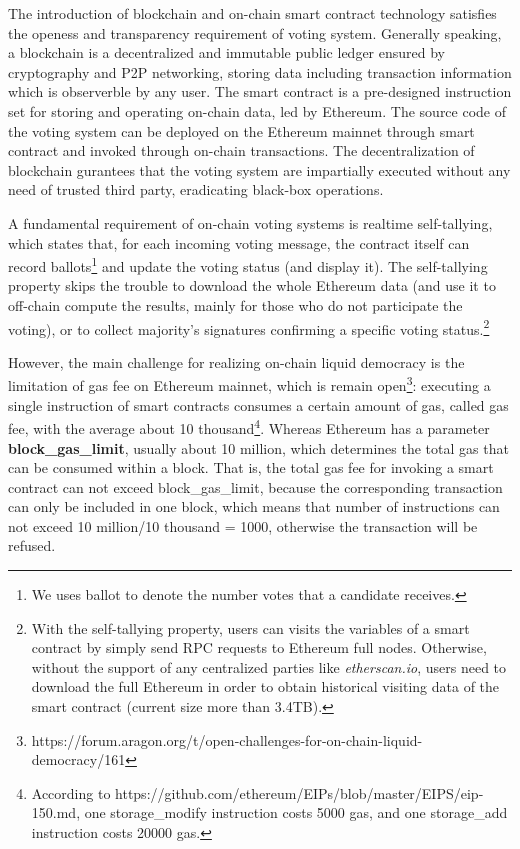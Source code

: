 The introduction of blockchain \cite{nakamoto2008bitcoin} and on-chain smart contract technology \cite{wood2014ethereum} satisfies the openess and transparency requirement of voting system. Generally speaking, a blockchain is a decentralized and immutable public ledger ensured by cryptography and P2P networking, storing data including transaction information which is observerble by any user. The smart contract is a pre-designed instruction set for storing and operating on-chain data, led by Ethereum. The source code of the voting system can be deployed on the Ethereum mainnet through smart contract and invoked through on-chain transactions. %
The decentralization of blockchain gurantees that the voting system are impartially executed without any need of trusted third party, eradicating black-box operations.

 A fundamental requirement of on-chain voting systems is realtime self-tallying, which states that, for each incoming voting message,  the contract itself can record ballots\footnote{We uses ballot to denote the number votes that a candidate receives.} and update the voting status (and display it). The self-tallying property skips the trouble to download the whole Ethereum data (and use it to off-chain compute the results, mainly for those who do not participate the voting), or to collect majority’s signatures confirming a specific voting status.\footnote{With the self-tallying property, users can visits the variables of a smart contract by simply send RPC requests to Ethereum full nodes. Otherwise, without the support of any centralized parties like {\em etherscan.io}, users need to download the full Ethereum in order to obtain historical visiting data of the smart contract (current size more than 3.4TB).}

However, the main challenge for realizing on-chain liquid democracy is the limitation of gas fee on Ethereum mainnet, which is remain open\footnote{https://forum.aragon.org/t/open-challenges-for-on-chain-liquid-democracy/161}: executing a single instruction of smart contracts consumes a certain amount of gas, called gas fee, with the average about 10 thousand\footnote{According to https://github.com/ethereum/EIPs/blob/master/EIPS/eip-150.md, one storage\_modify instruction costs 5000 gas, and one storage\_add instruction costs 20000 gas.}.  Whereas Ethereum has a parameter \textbf{block\_gas\_limit}, usually about 10 million, which determines the total gas that can be consumed within a block. That is, the total gas fee for invoking a smart contract can not exceed block\_gas\_limit, because the corresponding transaction can only be included in one block, which means that number of instructions can not exceed 10 million/10 thousand = 1000, otherwise the transaction will be refused. 

